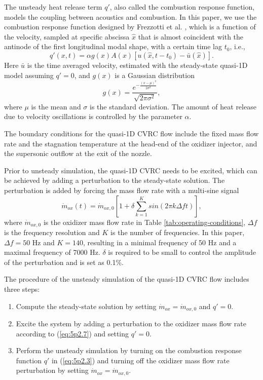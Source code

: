 The unsteady heat release term $q'$, also called the combustion response function, models the coupling between acoustics and combustion. In this paper, we use the combustion response function designed by Frezzotti et al. \cite{frezzotti2017numerical,frezzotti2018quasi}, which is a function of the velocity, sampled at specific abscissa $\hat{x}$ that is almost coincident with the antinode of the first longitudinal modal shape, with a certain time lag $t_0$, i.e.,
\begin{equation}\label{eq:5p2.7}
q'\left( x,t\right) = \alpha g\left(x\right)  A\left(x\right) \left[ u\left( \hat{x},t-t_0 \right) - \bar{u}\left( \hat{x} \right) \right].
\end{equation}
Here $\bar{u}$ is the time averaged velocity, estimated with the steady-state quasi-1D model assuming $q'=0$, and $g(x)$ is a Gaussian distribution  
\begin{equation}\label{eq:5p2.8}
g\left(x\right)= \frac{e^{-\frac{\left(x-\mu\right)^2}{2\sigma^2}}}{\sqrt{2\pi\sigma^2}},
\end{equation}
where $\mu$ is the mean and $\sigma$ is the standard deviation. The amount of heat release due to velocity oscillations is controlled by the parameter $\alpha$.

The boundary conditions for the quasi-1D CVRC flow include the fixed mass flow rate and the stagnation temperature at the head-end of the oxidizer injector, and the supersonic outflow at the exit of the nozzle.

Prior to unsteady simulation, the quasi-1D CVRC needs to be excited, which can be achieved by adding a perturbation to the steady-state solution. The perturbation is added by forcing the mass flow rate with a multi-sine signal
\begin{equation}\label{eq:5p2.9}
\dot{m}_{ox} \left(t\right)= \dot{m}_{ox,0} \left[1 + \delta\sum_{k=1}^{K}  sin\left(2\pi k\Delta f t\right) \right],
\end{equation}
where $\dot{m}_{ox,0}$ is the oxidizer mass flow rate in Table \ref{tab:operating-conditions}, $\Delta f$ is the frequency resolution and $K$ is the number of frequencies. In this paper, $\Delta f = 50 $ Hz and $K=140$, resulting in a minimal frequency of 50 Hz and a maximal frequency of 7000 Hz. $\delta$ is required to be small to control the amplitude of the perturbation and is set as 0.1\%.

The procedure of the unsteady simulation of the quasi-1D CVRC flow includes three steps:
\begin{enumerate}
	\item  Compute the steady-state solution by setting $\dot{m}_{ox}=\dot{m}_{ox,0} $ and $q'=0$.
	\item  Excite the system by adding a perturbation to the oxidizer mass flow rate according to (\ref{eq:5p2.7}) and setting $q'=0$.
	\item  Perform the unsteady simulation by turning on the combustion response function $q'$ in (\ref{eq:5p2.3}) and turning off the oxidizer mass flow rate perturbation by setting $\dot{m}_{ox}=\dot{m}_{ox,0} $.	
\end{enumerate}

